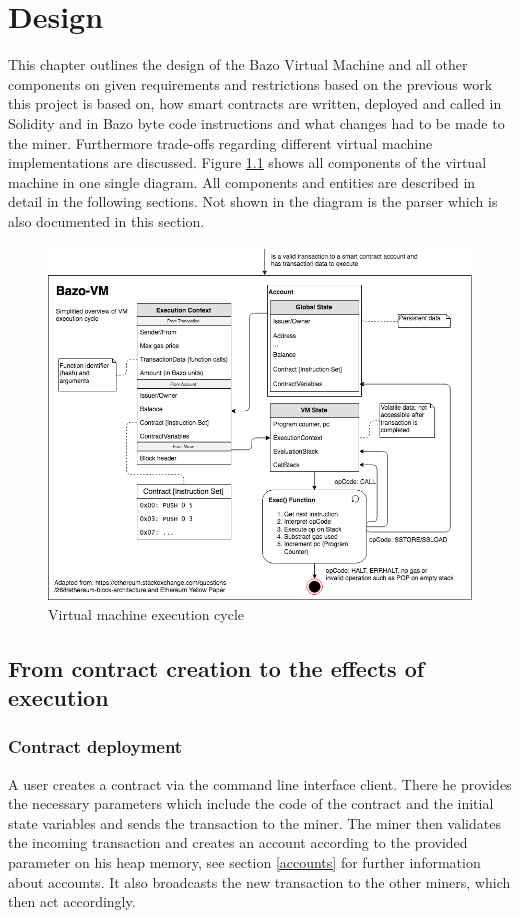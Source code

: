 \chapter{Design}
\thispagestyle{main} %
This chapter outlines the design of the Bazo Virtual Machine and all other components on given requirements and restrictions based on the previous work this project is based on, how smart contracts are written, deployed and called in Solidity and in Bazo byte code instructions and what changes had to be made to the miner. Furthermore trade-offs regarding different virtual machine implementations are discussed. Figure \ref{vmexecutioncycle} shows all components of the virtual machine in one single diagram. All components and entities are described in detail in the following sections. Not shown in the diagram is the parser which is also documented in this section.

\begin{figure}[H]
	\begin{center}
	\includegraphics[width=\textwidth]{./images/execution-cycle}
	\caption{Virtual machine execution cycle}
	\label{vmexecutioncycle}
	\end{center}
\end{figure}

\section{From contract creation to the effects of execution}
\subsection{Contract deployment}
A user creates a contract via the command line interface client. There he provides the necessary parameters which include the code of the contract and the initial state variables and sends the transaction to the miner. The miner then validates the incoming transaction and creates an account according to the provided parameter on his heap memory, see section \ref{accounts} for further information about accounts. It also broadcasts the new transaction to the other miners, which then act accordingly.

